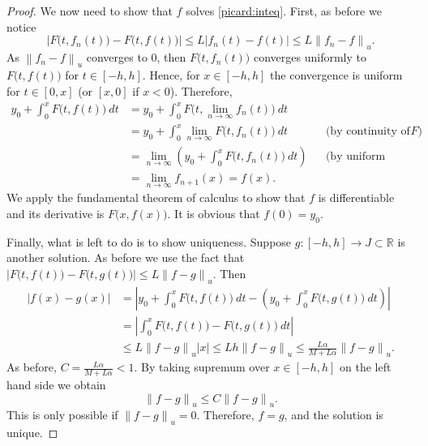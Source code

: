 \documentclass[12pt]{book}
\newcommand{\abs}[1]{\left\lvert {#1} \right\rvert}
\newcommand{\norm}[1]{\left\lVert {#1} \right\rVert}
\newcommand{\R}{{\mathbb{R}}}
\theoremstyle{plain}
\theoremstyle{remark}
\theoremstyle{definition}
\theoremstyle{exercise}
\theoremstyle{example}
\begin{document}
\begin{proof}
We now need to show that $f$ solves \eqref{picard:inteq}.
First, as before we notice
\begin{equation*}
\abs{F\bigl(t,f_{n}(t)\bigr) - 
F\bigl(t,f(t)\bigr)}
\leq
L \abs{f_n(t)-f(t)}
\leq
L \norm{f_n-f}_u .
\end{equation*}
As $\norm{f_n-f}_u$ converges to 0, then
$F\bigl(t,f_n(t)\bigr)$ converges uniformly to $F\bigl(t,f(t)\bigr)$
for $t \in [-h,h]$.  Hence, for $x \in [-h,h]$
the convergence is uniform %
for $t \in [0,x]$ (or $[x,0]$ if $x < 0$).  Therefore,
\begin{align*}
y_0
+
\int_0^{x}
F(t,f(t)\bigr)~dt
& =
y_0
+
\int_0^{x}
F\bigl(t,\lim_{n\to\infty} f_n(t)\bigr)~dt
& &
\\
& =
y_0
+
\int_0^{x}
\lim_{n\to\infty} F\bigl(t,f_n(t)\bigr)~dt
& & \text{(by continuity of $F$)}
\\
& =
\lim_{n\to\infty} 
\left(
y_0
+
\int_0^{x}
F\bigl(t,f_n(t)\bigr)~dt
\right)
& & \text{(by uniform convergence)}
\\
& =
\lim_{n\to\infty} 
f_{n+1}(x)
=
f(x) .
& &
\end{align*}
We apply the fundamental theorem of calculus to show that
$f$ is differentiable and its derivative is $F\bigl(x,f(x)\bigr)$.  It is obvious
that $f(0) = y_0$.

Finally, what is left to do is to show uniqueness.  Suppose $g \colon [-h,h]
\to J \subset \R$ is another solution.
As before we use the fact that
$\abs{F\bigl(t,f(t)\bigr) - F\bigl(t,g(t)\bigr)} \leq L \norm{f-g}_u$.
Then
\begin{equation*}
\begin{split}
\abs{f(x)-g(x)}
& =
\abs{
y_0
+
\int_0^{x}
F\bigl(t,f(t)\bigr)~dt
-
\left(
y_0
+
\int_0^{x}
F\bigl(t,g(t)\bigr)~dt
\right)
}
\\
& =
\abs{
\int_0^{x}
F\bigl(t,f(t)\bigr)
-
F\bigl(t,g(t)\bigr)~dt
}
\\
& \leq
L\norm{f-g}_u\abs{x}
\leq
Lh\norm{f-g}_u
\leq
\frac{L\alpha}{M+L\alpha}\norm{f-g}_u .
\end{split}
\end{equation*}
As 
before, $C = \frac{L\alpha}{M+L\alpha} < 1$.  By taking supremum over $x \in
[-h,h]$ on the left
hand side we obtain
\begin{equation*}
\norm{f-g}_u \leq C \norm{f-g}_u .
\end{equation*}
This is only possible if $\norm{f-g}_u = 0$.  Therefore, $f=g$, and the
solution is unique.
\end{proof}
\end{document}
